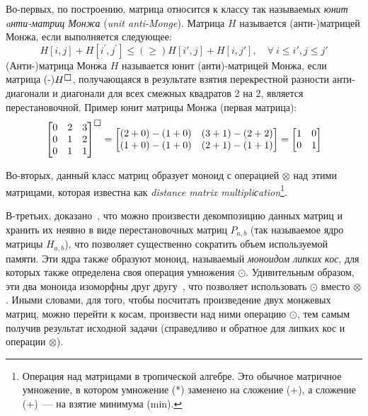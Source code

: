 Во-первых, по построению, матрица относится к классу так называемых  \emph{юнит aнти-матриц Монжа} (\emph{unit anti-Monge}).
Матрица $H$ называется (анти-)матрицей Монжа, если выполняется следующее:
\begin{equation}
    H[i, j] + H[i^{'},j^{'}] \leq(\geq) H[i', j] + H[i,j'] ,\quad \forall \: i \leq i' , j \leq j'
\end{equation}
(Анти-)матрица Монжа $H$ называется {юнит (анти)-матрицей Монжа}, если матрица (-)$H^{\msquare}$, получающаяся в результате взятия перекрестной разности анти-диагонали и диагонали для всех смежных квадратов 2 на 2,   является перестановочной. Пример {юнит матрицы Монжа} (первая матрица):
\begin{equation}
\begin{bmatrix}
0 & 2 & 3 \\
0 & 1 & 2 \\
0 & 1 & 1
\end{bmatrix} ^ { \msquare} =
\begin{bmatrix}
(2 + 0) - (1 + 0)  & (3 + 1) - (2 + 2)  \\
(1 + 0) - (1 + 0) &  (2 + 1) - (1 + 1) 
\end{bmatrix} = 
\begin{bmatrix}
1 & 0  \\
0 & 1 
\end{bmatrix} 
\end{equation}


Во-вторых, данный класс матриц образует моноид с операцией $\otimes$ над этими матрицами, которая известна как \emph{distance matrix multipliсation}\footnote{Операция над матрицами в тропической алгебре. Это обычное матричное умножение, в котором умножение (*) заменено на сложение (+), а сложение (+)~--- на взятие минимума (min).}.

В-третьих, доказано~\cite{tiskin2006all}, что можно произвести декомпозицию данных матриц и хранить их неявно в виде перестановочных матриц  $P_{a,b}$ (так называемое ядро матрицы $H_{a,b}$), что позволяет существенно сократить объем используемой памяти.
Эти ядра также образуют моноид, называемый \emph{моноидом липких кос}, для которых также определена своя операция умножения $\odot$.
Удивительным образом, эти два моноида изоморфны друг другу~\cite{tiskin2006all}, что позволяет использовать $\odot$ вместо $\otimes$. 
Иными словами, для того, чтобы посчитать произведение двух монжевых матриц, можно перейти к косам, произвести над ними операцию $\odot$, тем самым получив результат исходной задачи (справедливо и обратное для липких кос и операции $\otimes$).
    

